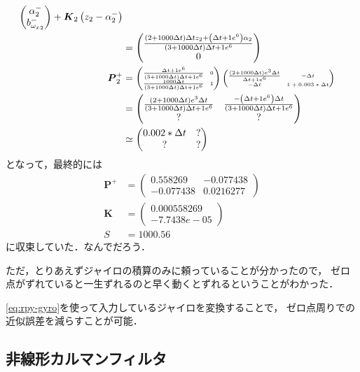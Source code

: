 \begin{align}
\begin{pmatrix}
    \alpha_{2}^{-}\\
    b_{{\omega_x}_{2}}^{-}
  \end{pmatrix} + \boldsymbol{K}_{2} \left(z_2 - \alpha_{2}^{-}\right)\\
  &=
  \begin{pmatrix}
    \frac{\left(2 + 1000 \Delta t\right)\Delta t z_2 + \left(\Delta t + 1e^6\right) \alpha_2}{\left(3 + 1000 \Delta t\right)\Delta t + 1e^{6}}\\
    0
  \end{pmatrix}\\
  \boldsymbol{P}_{2}^{+} &=
  {\tiny
    \setlength\arraycolsep{3pt}
    \begin{pmatrix}
      \frac{\Delta t + 1e^6}{\left(3 + 1000 \Delta t\right)\Delta t + 1e^{6}} & 0\\
      \frac{1000 \Delta t}{\left(3 + 1000 \Delta t\right)\Delta t + 1e^{6}} & 1
    \end{pmatrix}
    \begin{pmatrix}
      \frac{\left(2 + 1000 \Delta t\right) e^{3} \Delta t}{\Delta t + 1e^{6}} & - \Delta t\\
      - \Delta t & 1 + 0.003 * \Delta t
    \end{pmatrix}}\\
  &=
  \begin{pmatrix}
    \frac{\left(2 + 1000 \Delta t\right) e^{3} \Delta t}{\left(3 + 1000 \Delta t\right)\Delta t + 1e^{6}} & \frac{-\left(\Delta t + 1e^6\right) \Delta t}{\left(3 + 1000 \Delta t\right)\Delta t + 1e^{6}}\\
    ? & ?
  \end{pmatrix}\\
  &\simeq
  \begin{pmatrix}
    0.002 * \Delta t & ?\\
    ? & ?
  \end{pmatrix}
\end{align}
となって，最終的には
\begin{align}
  \boldsymbol{P}^{+} &=
  \begin{pmatrix}
    0.558269 & -0.077438\\
    -0.077438 & 0.0216277
  \end{pmatrix}\\
  \boldsymbol{K} &=
  \begin{pmatrix}
    0.000558269\\
    -7.7438e-05
  \end{pmatrix}\\
  S &= 1000.56
\end{align}
に収束していた．なんでだろう．

ただ，とりあえずジャイロの積算のみに頼っていることが分かったので，
ゼロ点がずれていると一生ずれるのと早く動くとずれるということがわかった．

\autoref{eq:rpy-gyro}を使って入力しているジャイロを変換することで，
ゼロ点周りでの近似誤差を減らすことが可能．

\subsection{非線形カルマンフィルタ}
